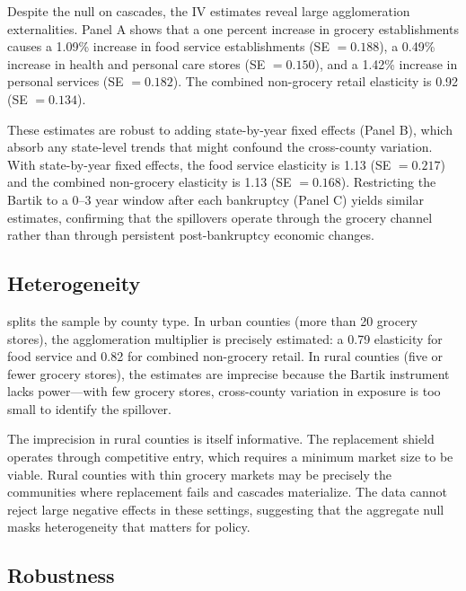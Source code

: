 \documentclass[12pt]{article}
\begin{document}
Despite the null on cascades, the IV estimates reveal large agglomeration externalities.  Panel A shows that a one percent increase in grocery establishments causes a 1.09\% increase in food service establishments (SE $= 0.188$), a 0.49\% increase in health and personal care stores (SE $= 0.150$), and a 1.42\% increase in personal services (SE $= 0.182$). The combined non-grocery retail elasticity is 0.92 (SE $= 0.134$).

These estimates are robust to adding state-by-year fixed effects (Panel B), which absorb any state-level trends that might confound the cross-county variation. With state-by-year fixed effects, the food service elasticity is 1.13 (SE $= 0.217$) and the combined non-grocery elasticity is 1.13 (SE $= 0.168$). Restricting the Bartik to a 0--3 year window after each bankruptcy (Panel C) yields similar estimates, confirming that the spillovers operate through the grocery channel rather than through persistent post-bankruptcy economic changes.



\subsection{Heterogeneity}

 splits the sample by county type. In urban counties (more than 20 grocery stores), the agglomeration multiplier is precisely estimated: a 0.79 elasticity for food service and 0.82 for combined non-grocery retail. In rural counties (five or fewer grocery stores), the estimates are imprecise because the Bartik instrument lacks power---with few grocery stores, cross-county variation in exposure is too small to identify the spillover.

The imprecision in rural counties is itself informative. The replacement shield operates through competitive entry, which requires a minimum market size to be viable. Rural counties with thin grocery markets may be precisely the communities where replacement fails and cascades materialize. The data cannot reject large negative effects in these settings, suggesting that the aggregate null masks heterogeneity that matters for policy.



\subsection{Robustness}
\end{document}
